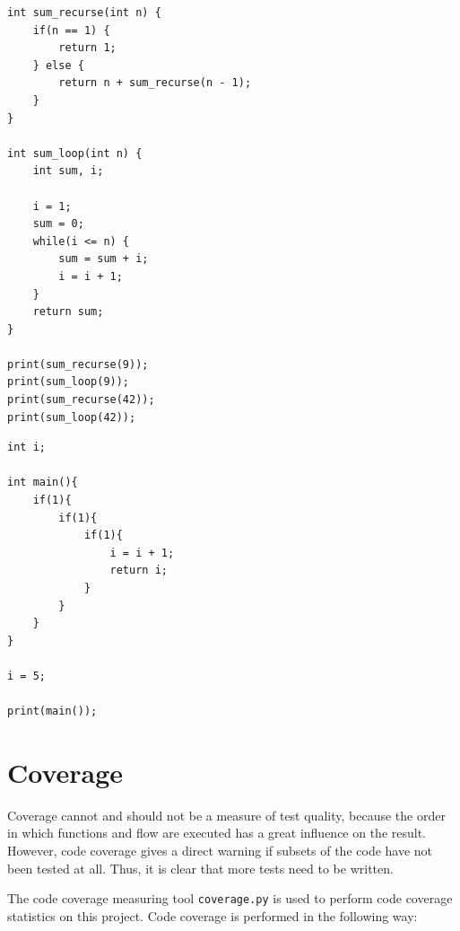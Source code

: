 \begin{verbatim}
int sum_recurse(int n) {
    if(n == 1) {
        return 1;
    } else {
        return n + sum_recurse(n - 1);
    }
}

int sum_loop(int n) {
    int sum, i;
  
    i = 1;
    sum = 0;
    while(i <= n) {
        sum = sum + i;
        i = i + 1;
    }
    return sum;
}

print(sum_recurse(9));
print(sum_loop(9));
print(sum_recurse(42));
print(sum_loop(42));
\end{verbatim}

\begin{verbatim}
int i;

int main(){
    if(1){
        if(1){
            if(1){
                i = i + 1;
                return i;
            }
        }
    }
}

i = 5;

print(main());
\end{verbatim}

\newpage

\section{Coverage}
Coverage cannot and should not be a measure of test quality, because the order in which functions and flow are executed has a great influence on the result. However, code coverage gives a direct warning if subsets of the code have not been tested at all. Thus, it is clear that more tests need to be written.

The code coverage measuring tool \texttt{coverage.py} is used to perform code coverage statistics on this project. Code coverage is performed in the following way:

